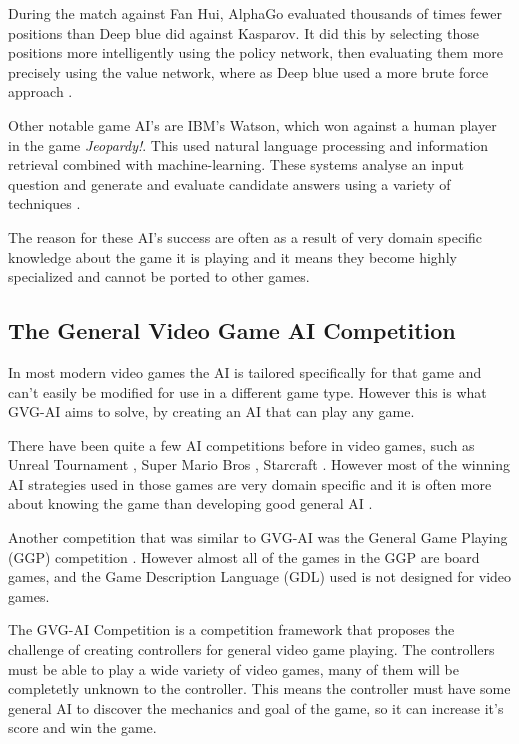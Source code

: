 \documentclass[journal]{IEEEtran}
\begin{document}
		During the match against Fan Hui, AlphaGo evaluated thousands of times fewer positions than Deep blue did against Kasparov. It did this by selecting those positions more intelligently using the policy network, then evaluating them more precisely using the value network, where as Deep blue used a more brute force approach \cite{silver2016mastering, DeepBlue}.
		
		Other notable game AI's are IBM's Watson, which won against a human player in the game \textit{Jeopardy!}. This used natural language processing and information retrieval combined with machine-learning. These systems analyse an input question and generate and evaluate candidate answers using a variety of techniques \cite{ferrucci2013watson}.

		The reason for these AI's success are often as a result of very domain specific knowledge about the game it is playing and it means they become highly specialized and cannot be ported to other games.
		

	\subsection{The General Video Game AI Competition}
	
		In most modern video games the AI is tailored specifically for that game and can't easily be modified for use in a different game type. However this is what GVG-AI aims to solve, by creating an AI that can play any game. 
		
		There have been quite a few AI competitions before in video games, such as Unreal Tournament \cite{hingston2010new}, Super Mario Bros \cite{citationNeeded}, Starcraft \cite{ontanon2013survey}. 
		However most of the winning AI strategies used in those games are very domain specific and it is often more about knowing the game than developing good general AI \cite{perez20162014}. 
		 \par
		
		
		Another competition that was similar to GVG-AI was the General Game Playing (GGP) competition \cite{GGP2005general}. However almost all of the games in the GGP are board games, and the Game Description Language (GDL) used is not designed for video games.
		
		The GVG-AI Competition is a competition framework that proposes the challenge of creating controllers for general video game playing. The controllers must be able to play a wide variety of video games, many of them will be completetly unknown to the controller. This means the controller must have some general AI to discover the mechanics and goal of the game, so it can increase it's score and win the game. \cite{GVGAI, perez20162014}
		
\end{document}
